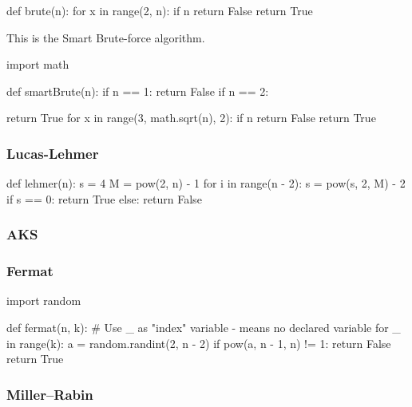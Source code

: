 \documentclass[main.tex]{subfiles}
\begin{document}
\begin{python}
    def brute(n):
        for x in range(2, n):
            if n %
                return False
        return True
\end{python}

\vspace{10mm}

This is the Smart Brute-force algorithm.

\begin{python}
    import math

    def smartBrute(n):
        if n == 1:
            return False
        if n == 2:

            return True
        for x in range(3, math.sqrt(n), 2):
            if n %
                return False
        return True
\end{python}

\subsubsection{Lucas-Lehmer}

\begin{python}
    def lehmer(n):
        s = 4
        M = pow(2, n) - 1
        for i in range(n - 2):
            s = pow(s, 2, M) - 2
        if s == 0:
            return True
        else:
            return False
\end{python}

\subsubsection{AKS}

\subsubsection{Fermat}

\begin{python}
    import random


    def fermat(n, k):
        # Use _ as "index" variable - means no declared variable
        for _ in range(k):
            a = random.randint(2, n - 2)
            if pow(a, n - 1, n) != 1:
                return False
            return True  
\end{python}

\subsubsection{Miller–Rabin}
\end{document}
